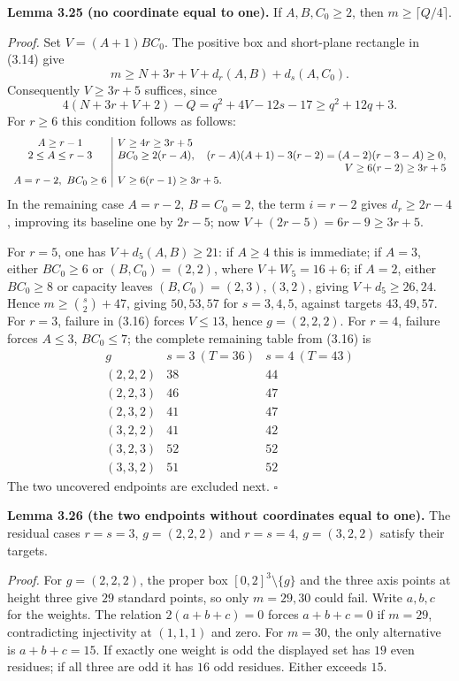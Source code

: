 \documentclass[11pt]{article}
\begin{document}
\label{res:A3.2}
\textbf{Lemma 3.25 (no coordinate equal to one).}
If $A,B,C_0\ge2$, then $m\ge\lceil Q/4\rceil$.

\emph{Proof.}
Set $V=(A+1)BC_0$.  The positive box and short-plane rectangle in
(3.14) give
\[
 m\ge N+3r+V+d_r(A,B)+d_s(A,C_0).\tag{3.16}
\]
Consequently $V\ge3r+5$ suffices, since
\[
 4(N+3r+V+2)-Q=q^2+4V-12s-17\ge q^2+12q+3.\tag{3.17}
\]
For $r\ge6$ this condition follows as follows:
\[
\begin{array}{c|l}
A\ge r-1&V\ge4r\ge3r+5\\
2\le A\le r-3&BC_0\ge2(r-A),\quad
 (r-A)(A+1)-3(r-2)=(A-2)(r-3-A)\ge0,\\
 &\hfill V\ge6(r-2)\ge3r+5\\
A=r-2,\ BC_0\ge6&V\ge6(r-1)\ge3r+5.
\end{array}
\]
In the remaining case $A=r-2$, $B=C_0=2$, the term $i=r-2$ gives
$d_r\ge2r-4$, improving its baseline one by $2r-5$; now
$V+(2r-5)=6r-9\ge3r+5$.

For $r=5$, one has $V+d_5(A,B)\ge21$: if $A\ge4$ this is immediate;
if $A=3$, either $BC_0\ge6$ or $(B,C_0)=(2,2)$, where $V+W_5=16+6$;
if $A=2$, either $BC_0\ge8$ or capacity leaves $(B,C_0)=(2,3),(3,2)$,
giving $V+d_5\ge26,24$.  Hence $m\ge\binom s2+47$, giving
$50,53,57$ for $s=3,4,5$, against targets $43,49,57$.
For $r=3$, failure in (3.16) forces $V\le13$, hence $g=(2,2,2)$.
For $r=4$, failure forces $A\le3$, $BC_0\le7$; the complete remaining
table from (3.16) is
\[
\begin{array}{c|rr}
g&s=3\ (T=36)&s=4\ (T=43)\\\hline
(2,2,2)&38&44\\
(2,2,3)&46&47\\
(2,3,2)&41&47\\
(3,2,2)&41&42\\
(3,2,3)&52&52\\
(3,3,2)&51&52
\end{array}
\]
The two uncovered endpoints are excluded next. \ensuremath{\square}

\label{res:A3.3}
\textbf{Lemma 3.26 (the two endpoints without coordinates equal to one).}
The residual cases $r=s=3$, $g=(2,2,2)$ and $r=s=4$, $g=(3,2,2)$
satisfy their targets.

\emph{Proof.}
For $g=(2,2,2)$, the proper box $[0,2]^3\setminus\{g\}$ and the three
axis points at height three give $29$ standard points, so only $m=29,30$
could fail.  Write $a,b,c$ for the weights.  The relation
$2(a+b+c)=0$ forces $a+b+c=0$ if $m=29$, contradicting injectivity at
$(1,1,1)$ and zero.  For $m=30$, the only alternative is $a+b+c=15$.
If exactly one weight is odd the displayed set has $19$ even residues;
if all three are odd it has $16$ odd residues.  Either exceeds $15$.
\end{document}
